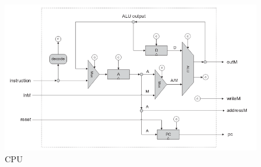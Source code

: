 \documentclass[11pt]{article}
\begin{document}
\begin{figure}
  \centering
  \includegraphics[scale=0.5]{pictures/cpu.png}
  \caption{CPU}
  \label{fig:cpu}
\end{figure}
\end{document}
